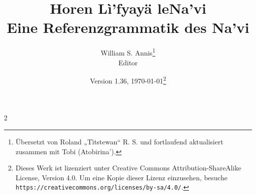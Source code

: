 \documentclass[12pt,oneside]{book}
\begin{document}
\frenchspacing

\title{Horen Lì'fyayä leNa'vi\\Eine Referenzgrammatik des Na'vi}
\author{William S. Annis\footnote{Übersetzt von Roland „Tìtstewan“ R. S. und fortlaufend aktualisiert zusammen mit Tobi (Atobirina').}\\Editor}
\date{Version 1.36, \today\footnote{Dieses Werk ist lizenziert unter Creative Commons Attribution-ShareAlike License, Version 4.0. Um eine Kopie dieser Lizenz einzusehen, besuche \texttt{https://creativecommons.org/licenses/by-sa/4.0/}.}}
\maketitle

\setcounter{tocdepth}{2}
\begin{multicols}{2}
\tableofcontents
\end{multicols}










\appendix
{}
{\small 

\printindex}
\end{document}
